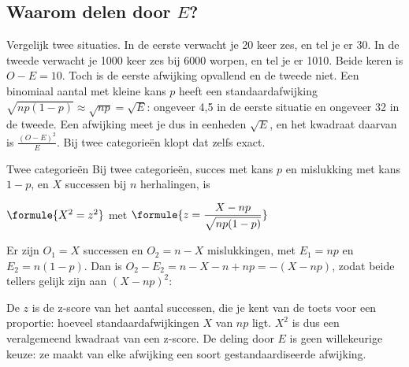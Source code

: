\begin{oefeningen}
\end{oefeningen}

\subsection{Waarom delen door $E$?}

Vergelijk twee situaties. In de eerste verwacht je 20 keer zes, en tel je er 30. In de tweede verwacht je 1000 keer zes bij 6000 worpen, en tel je er 1010. Beide keren is $O - E = 10$. Toch is de eerste afwijking opvallend en de tweede niet. Een binomiaal aantal met kleine kans $p$ heeft een standaardafwijking $\sqrt{np(1 - p)} \approx \sqrt{np} = \sqrt{E}$: ongeveer 4,5 in de eerste situatie en ongeveer 32 in de tweede. Een afwijking meet je dus in eenheden $\sqrt{E}$, en het kwadraat daarvan is $\frac{(O - E)^2}{E}$. Bij twee categorieën klopt dat zelfs exact.

\begin{theorie}
\begin{stelling}{Twee categorieën}
Bij twee categorieën, succes met kans $p$ en mislukking met kans $1 - p$, en $X$ successen bij $n$ herhalingen, is

\vspace{1mm}
\qquad $\formule{X^2 = z^2}$ \quad met \quad $\formule{z = \dfrac{X - np}{\sqrt{np(1 - p)}}}$
\end{stelling}

\begin{bewijs}
Er zijn $O_1 = X$ successen en $O_2 = n - X$ mislukkingen, met $E_1 = np$ en $E_2 = n(1 - p)$. Dan is $O_2 - E_2 = n - X - n + np = -(X - np)$, zodat beide tellers gelijk zijn aan $(X - np)^2$:
\end{bewijs}
\end{theorie}

De $z$ is de z-score van het aantal successen, die je kent van de toets voor een proportie: hoeveel standaardafwijkingen $X$ van $np$ ligt. $X^2$ is dus een veralgemeend kwadraat van een z-score. De deling door $E$ is geen willekeurige keuze: ze maakt van elke afwijking een soort gestandaardiseerde afwijking.


